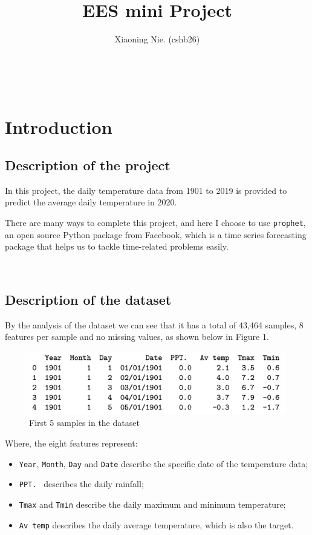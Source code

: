 \documentclass{article}
\title{EES mini Project}
\author{Xiaoning Nie. (cshb26)}
\begin{document}
\maketitle

\


\section{Introduction}

\subsection{Description of the project}

In this project, the daily temperature data from 1901 to 2019 is provided to predict the average daily temperature in 2020.

There are many ways to complete this project, and here I choose to use \verb|prophet|, an open source Python package from Facebook, which is a time series forecasting package that helps us to tackle time-related problems easily.

\

\subsection{Description of the dataset}

By the analysis of the dataset we can see that it has a total of 43,464 samples, 8 features per sample and no missing values, as shown below in Figure 1.

\begin{figure}[hp]
\centering
\includegraphics[width=12cm]{datadesc.png} %
\caption{First 5 samples in the dataset} %
\end{figure}

Where, the eight features represent:

\begin{itemize}
\item \verb|Year|, \verb|Month|, \verb|Day| and \verb|Date| describe the specific date of the temperature data;
\item \verb|PPT. | describes the daily rainfall;
\item \verb|Tmax| and \verb|Tmin| describe the daily maximum and minimum temperature;
\item \verb|Av temp| describes the daily average temperature, which is also the target.
\end{itemize}
\end{document}

